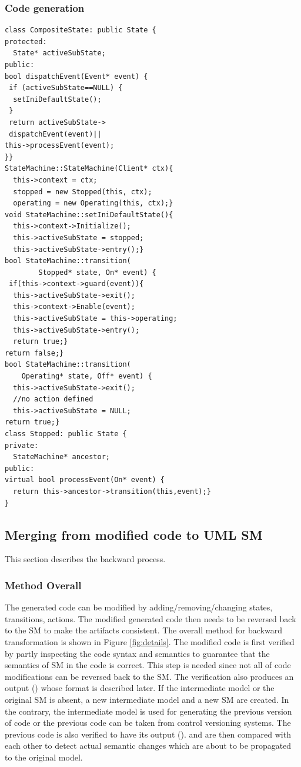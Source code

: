 \subsubsection{Code generation}
\label{subsec:codegen}
\begin{minipage}{\linewidth}
\begin{lstlisting}[caption=A segment of C++ generated code, label=lst:code-segment]
class CompositeState: public State {
protected:
  State* activeSubState;
public:
bool dispatchEvent(Event* event) {
 if (activeSubState==NULL) {
  setIniDefaultState();
 }
 return activeSubState->
 dispatchEvent(event)||
this->processEvent(event);            
}}
StateMachine::StateMachine(Client* ctx){
  this->context = ctx;
  stopped = new Stopped(this, ctx);
  operating = new Operating(this, ctx);}
void StateMachine::setIniDefaultState(){
  this->context->Initialize();
  this->activeSubState = stopped;
  this->activeSubState->entry();}
bool StateMachine::transition(
        Stopped* state, On* event) {
 if(this->context->guard(event)){
  this->activeSubState->exit();
  this->context->Enable(event);
  this->activeSubState = this->operating;
  this->activeSubState->entry();
  return true;}
return false;}
bool StateMachine::transition(
    Operating* state, Off* event) {
  this->activeSubState->exit();
  //no action defined
  this->activeSubState = NULL;
return true;}
class Stopped: public State {
private:
  StateMachine* ancestor;
public: 
virtual bool processEvent(On* event) {
  return this->ancestor->transition(this,event);}
}
\end{lstlisting}
\end{minipage}

\subsection{Merging from modified code to UML SM}
This section describes the backward process. 

\subsubsection{Method Overall}
The generated code can be modified by adding/removing/changing states, transitions, actions. The modified generated code then needs to be reversed back to the SM to make the artifacts consistent. The overall method for backward transformation is shown in Figure \ref{fig:details}. The modified code is first verified by partly inspecting the code syntax and semantics to guarantee that the semantics of SM in the code is correct. This step is needed since not all of code modifications can be reversed back to the SM. The verification also produces an output () whose format is described later. If the intermediate model or the original SM is absent, a new intermediate model and a new SM are created. In the contrary, the intermediate model is used for generating the previous version of code or the previous code can be taken from control versioning systems. The previous code is also verified to have its output ().  and  are then compared with each other to detect actual semantic changes which are about to be propagated to the original model. 

